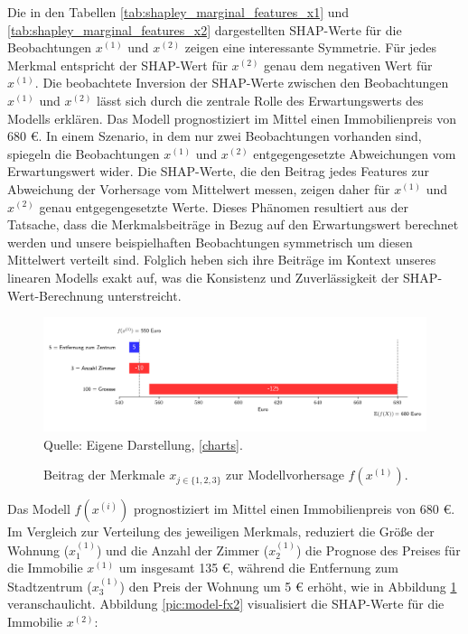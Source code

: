 Die in den Tabellen \ref{tab:shapley_marginal_features_x1} und \ref{tab:shapley_marginal_features_x2} 
dargestellten SHAP-Werte für die Beobachtungen \( x^{(1)} \) und \( x^{(2)} \) zeigen eine interessante Symmetrie. 
Für jedes Merkmal entspricht der SHAP-Wert für \( x^{(2)} \) genau dem negativen Wert für \( x^{(1)} \). 
Die beobachtete Inversion der SHAP-Werte zwischen den Beobachtungen \( x^{(1)} \) und \( x^{(2)} \) 
lässt sich durch die zentrale Rolle des Erwartungswerts des Modells erklären. 
Das Modell prognostiziert im Mittel einen Immobilienpreis von 680 \euro. In einem Szenario, in dem nur zwei 
Beobachtungen vorhanden sind, spiegeln die Beobachtungen \( x^{(1)} \) und \( x^{(2)} \) entgegengesetzte 
Abweichungen vom Erwartungswert wider. Die SHAP-Werte, die den Beitrag jedes Features zur Abweichung 
der Vorhersage vom Mittelwert messen, zeigen daher für \( x^{(1)} \) und \( x^{(2)} \) genau entgegengesetzte Werte. 
Dieses Phänomen resultiert aus der Tatsache, dass die Merkmalsbeiträge in Bezug auf den Erwartungswert 
berechnet werden und unsere beispielhaften Beobachtungen symmetrisch um diesen Mittelwert verteilt sind. 
Folglich heben sich ihre Beiträge im Kontext unseres linearen Modells exakt auf, was die Konsistenz und 
Zuverlässigkeit der SHAP-Wert-Berechnung unterstreicht.


\begin{figure}[H]
    \caption{Beitrag der Merkmale $x_{j \in \{1, 2, 3\}}$ zur Modellvorhersage $f(x^{(1)})$.}
    \includegraphics[width=1\textwidth]{../scripts/images/model-output-x1.png}
    Quelle: Eigene Darstellung, \ref{charts}.
    \label{pic:model-fx1}
\end{figure}

Das Modell $f(x^{(i)})$
prognostiziert im Mittel einen Immobilienpreis von 680 \euro{}. Im Vergleich zur
Verteilung des jeweiligen Merkmals, reduziert die Größe der 
Wohnung ($x_1^{(1)}$) und die Anzahl der Zimmer ($x_2^{(1)}$) die Prognose 
des Preises für die Immobilie $x^{(1)}$ um insgesamt 135 \euro{}, während die Entfernung zum Stadtzentrum
($x_3^{(1)}$) den Preis der Wohnung um 5 \euro{} erhöht, wie in Abbildung 
\ref{pic:model-fx1} veranschaulicht. Abbildung \ref{pic:model-fx2} visualisiert die SHAP-Werte für die Immobilie $x^{(2)}$:


